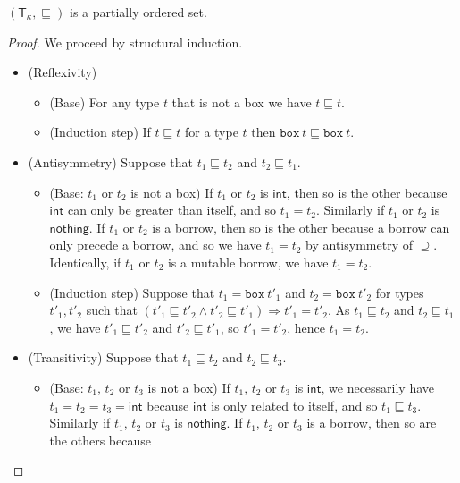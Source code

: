 \begin{lemma}
  \label{lemma:partial-order-types}
  $(\mathsf{T}_\kappa,\sqsubseteq)$ is a partially ordered set.
\end{lemma}
\begin{proof}
  We proceed by structural induction.
  \begin{itemize}
    \item (Reflexivity)
    \begin{itemize}
      \item (Base) For any type $t$ that is not a box we have
      $t\sqsubseteq t$.
      \item (Induction step) If $t\sqsubseteq t$ for a type $t$ then
      $\mathtt{box}\ t\sqsubseteq \mathtt{box}\ t$.
    \end{itemize}
    \item (Antisymmetry) Suppose that $t_1 \sqsubseteq t_2$ and
    $t_2 \sqsubseteq t_1$.
    \begin{itemize}
      \item (Base: $t_1$ or $t_2$ is not a box)
      If $t_1$ or $t_2$ is $\mathsf{int}$, then so is the other
      because $\mathsf{int}$ can only be greater than itself, and so $t_1 = t_2$.
      Similarly if $t_1$ or $t_2$ is $\mathsf{nothing}$.
      If $t_1$ or $t_2$ is a borrow, then so is the other because
      a borrow can only precede a borrow, and so we have $t_1 = t_2$
      by antisymmetry of $\supseteq$.
      Identically, if $t_1$ or $t_2$ is a mutable borrow, we have $t_1 = t_2$.
      \item (Induction step) Suppose that $t_1=\mathtt{box}\ t'_1$ and
      $t_2=\mathtt{box}\ t'_2$ for types $t'_1,t'_2$ such that
      $(t'_1 \sqsubseteq t'_2 \land t'_2 \sqsubseteq t'_1) \Rightarrow t'_1 = t'_2$.
      As $t_1 \sqsubseteq t_2$ and $t_2 \sqsubseteq t_1$, we have
      $t'_1 \sqsubseteq t'_2$ and $t'_2 \sqsubseteq t'_1$, so
      $t'_1 = t'_2$, hence $t_1 = t_2$.
    \end{itemize}
    \item (Transitivity) Suppose that $t_1 \sqsubseteq t_2$ and $t_2 \sqsubseteq t_3$.
    \begin{itemize}
      \item (Base: $t_1$, $t_2$ or $t_3$ is not a box)
      If $t_1$, $t_2$ or $t_3$ is $\mathsf{int}$, we necessarily have
      $t_1=t_2=t_3=\mathsf{int}$ because $\mathsf{int}$ is only related to
      itself, and so $t_1\sqsubseteq t_3$. Similarly if
      $t_1$, $t_2$ or $t_3$ is $\mathsf{nothing}$.
      If $t_1$, $t_2$ or $t_3$ is a borrow, then so are the others because

\end{itemize}
\end{itemize}
\end{proof}
